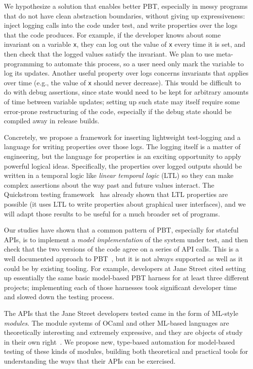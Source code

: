 We hypothesize a solution that enables better PBT,
especially in messy programs that do not have clean abstraction boundaries,
without giving
up expressiveness: inject logging calls into the code under test, and write
properties over the logs that the code produces. For example, if the developer
knows about some invariant on a variable \lstinline{x}, they can log out the
value of \lstinline{x} every time it is set, and then check that the logged
values satisfy the invariant. We plan to use meta-programming to automate this
process, so a user need only mark the variable to log its updates. Another
useful property over logs concerns
invariants that applies over time (e.g., the value of \lstinline{x} should
never decrease).
This would be difficult to do with debug assertions, since state would need to
be kept for arbitrary amounts of time between variable updates; setting up such
state may itself require some error-prone restructuring of the code, especially
if the debug state should be compiled away in release builds.

Concretely, we propose a framework for inserting lightweight test-logging and a
language for writing properties over those logs. The logging itself is a matter
of engineering, but the language for properties is an exciting opportunity to
apply powerful logical ideas. Specifically, the properties over logged outputs
should be written in a temporal logic like {\em linear temporal logic} (LTL) so
they can make complex assertions about the way past and future values interact.
The Quickstrom testing framework~\cite{oconnor_quickstrom_2022} has already shown that
LTL properties are possible (it uses LTL to write properties about graphical
user interfaces), and we will adapt those results to be useful for a much
broader set of programs.

Our studies have shown that a common pattern of PBT, especially for stateful
APIs, is to implement a {\em model implementation} of the system under test, and
then check that the two versions of the code agree on a series of API calls.
This is a well documented approach to PBT~\cite{hughes_experiences_2016}, but it
is not always supported as well as it could be by existing tooling. For example,
developers at Jane Street cited setting up essentially the same basic
model-based PBT harness for at least three different projects; implementing each
of those harnesses took significant developer time and slowed down the testing
process.

The APIs that the Jane Street developers tested came in the form of ML-style
{\em modules}. The module systems of OCaml and other
ML-based languages are theoretically interesting and extremely expressive, and
they are objects of study in their own right~\cite{macqueen_modules_1984}. We propose
new, type-based automation for model-based testing of these kinds of modules,
building both theoretical and practical tools for understanding the ways that
their APIs can be exercised.

